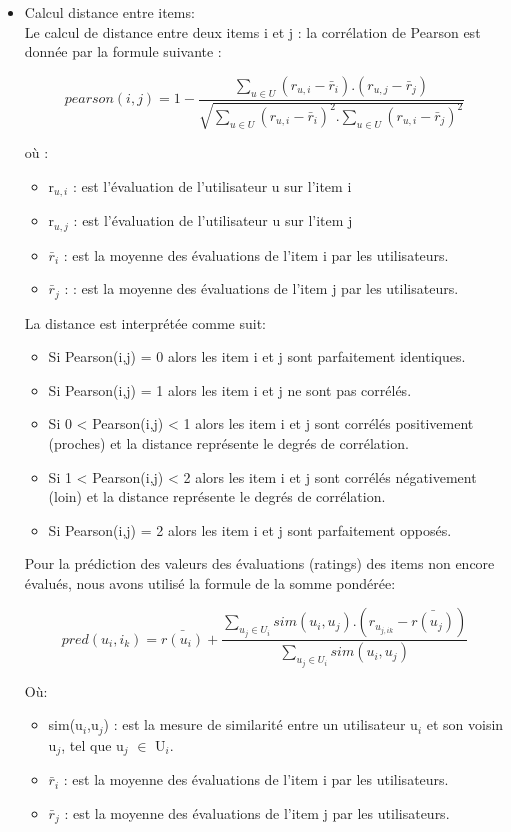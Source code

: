 \begin{itemize}
\item Calcul distance entre items:\\
Le calcul de distance entre deux items i et j : la corrélation de Pearson est donnée par la formule suivante :

\begin{equation}
pearson(i,j)= 1 - \frac{\sum_{u \in U} (r_{u,i}-\bar{r}_{i}).(r_{u,j}-\bar{r}_{j})}{\sqrt{\sum_{u \in U} (r_{u,i}-\bar{r}_{i})^{2}.\sum_{u \in U}(r_{u,i}-\bar{r}_{j})^{2}}}
\end{equation}

où :

\begin{itemize}
	\item r$_{u,i}$  : est l’évaluation de l’utilisateur u sur l’item i 
	\item r$_{u,j}$ : est l’évaluation de l’utilisateur u sur l’item j
	\item $\bar{r}_{i}$ : est la moyenne des évaluations de l’item i par les utilisateurs.
	\item $\bar{r}_{j}$ : : est la moyenne des évaluations de l’item j par les utilisateurs.
\end{itemize}
 
 
La distance est interprétée comme suit:
 
 \begin{itemize}
 	\item Si Pearson(i,j) = 0 alors les item i et j sont parfaitement identiques.
 	\item Si Pearson(i,j) = 1 alors les item i et j ne sont pas corrélés. 
 	\item Si 0 < Pearson(i,j) < 1  alors les item i et j  sont corrélés positivement (proches) et la distance représente le degrés de corrélation. 
 	\item Si 1 < Pearson(i,j) < 2  alors les item i et j sont corrélés négativement (loin) et la distance représente le degrés de corrélation. 
 	\item Si Pearson(i,j) = 2 alors les item i et j  sont parfaitement opposés.
 \end{itemize}


Pour la prédiction des valeurs des évaluations (ratings) des items non encore évalués, nous avons utilisé la formule de la somme pondérée:


\begin{equation}
pred(u_{i},i_{k})=\bar{r(u_{i})} + \frac{\sum_{u_{j} \in U_{i}} sim(u_{i},u_{j}).(r_{u_{j,ik}}-\bar{r(u_{j})})}{\sum_{u_{j} \in U_{i}} sim(u_{i},u_{j})}
\end{equation}

Où: 
\begin{itemize}
	\item sim(u$_{i}$,u$_{j}$) : est la mesure de similarité entre un utilisateur u$_{i}$ et son voisin u$_{j}$, tel que u$_{j}$ $\in$ U$_{i}$.
	\item $\bar{r}_{i}$ : est la moyenne des évaluations de l’item i par les utilisateurs.
	\item $\bar{r}_{j}$ : est la moyenne des évaluations de l’item j par les utilisateurs.
	
\end{itemize}
\end{itemize}
